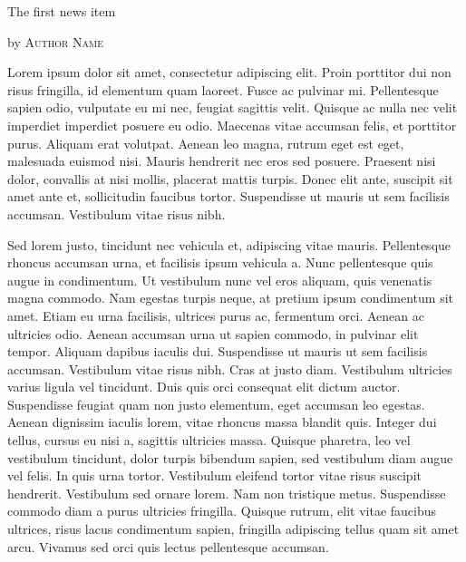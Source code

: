 \documentclass[10pt,a4paper]{article} %
\newcommand{\NewsItem}[1]{ %
    \usefont{T1}{fvs}{n}{n} %
    \vspace{24pt}\large #1\vspace{3pt} %
    \par \normalsize \normalfont}
\newcommand{\NewsAuthor}[1]{ %
    \hfill by \textsc{#1} \vspace{20pt} %
    \par \normalfont}
\begin{document}
\begin{multicols}{3} %


    \NewsItem{The first news item}
    \NewsAuthor{Author Name}

    Lorem ipsum dolor sit amet, consectetur adipiscing elit. Proin porttitor dui
    non risus fringilla, id elementum quam laoreet. Fusce ac pulvinar mi.
    Pellentesque sapien odio, vulputate eu mi nec, feugiat sagittis velit. Quisque
    ac nulla nec velit imperdiet imperdiet posuere eu odio. Maecenas vitae accumsan
    felis, et porttitor purus. Aliquam erat volutpat. Aenean leo magna, rutrum eget
    est eget, malesuada euismod nisi. Mauris hendrerit nec eros sed posuere.
    Praesent nisi dolor, convallis at nisi mollis, placerat mattis turpis. Donec
    elit ante, suscipit sit amet ante et, sollicitudin faucibus tortor. Suspendisse
    ut mauris ut sem facilisis accumsan. Vestibulum vitae risus nibh.

    Sed lorem justo, tincidunt nec vehicula et, adipiscing vitae mauris.
    Pellentesque rhoncus accumsan urna, et facilisis ipsum vehicula a. Nunc
    pellentesque quis augue in condimentum. Ut vestibulum nunc vel eros aliquam,
    quis venenatis magna commodo. Nam egestas turpis neque, at pretium ipsum
    condimentum sit amet. Etiam eu urna facilisis, ultrices purus ac, fermentum
    orci. Aenean ac ultricies odio. Aenean accumsan urna ut sapien commodo, in
    pulvinar elit tempor. Aliquam dapibus iaculis dui. Suspendisse ut mauris ut sem
    facilisis accumsan. Vestibulum vitae risus nibh. Cras at justo diam. Vestibulum
    ultricies varius ligula vel tincidunt. Duis quis orci consequat elit dictum
    auctor. Suspendisse feugiat quam non justo elementum, eget accumsan leo
    egestas. Aenean dignissim iaculis lorem, vitae rhoncus massa blandit quis.
    Integer dui tellus, cursus eu nisi a, sagittis ultricies massa. Quisque
    pharetra, leo vel vestibulum tincidunt, dolor turpis bibendum sapien, sed
    vestibulum diam augue vel felis. In quis urna tortor. Vestibulum eleifend
    tortor vitae risus suscipit hendrerit. Vestibulum sed ornare lorem. Nam non
    tristique metus. Suspendisse commodo diam a purus ultricies fringilla. Quisque
    rutrum, elit vitae faucibus ultrices, risus lacus condimentum sapien, fringilla
    adipiscing tellus quam sit amet arcu. Vivamus sed orci quis lectus pellentesque
    accumsan.


\end{multicols}
\end{document}
